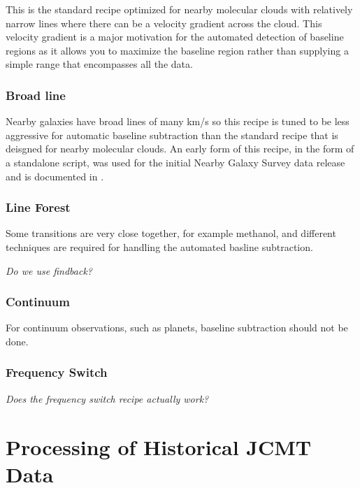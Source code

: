\documentclass[final,authoryear,5p,times,twocolumn]{elsarticle}
\begin{document}
This is the standard recipe optimized for nearby molecular clouds with
relatively narrow lines where there can be a velocity gradient across
the cloud. This velocity gradient is a major motivation for the
automated detection of baseline regions as it allows you to maximize
the baseline region rather than supplying a simple range that
encompasses all the data.

\subsubsection{Broad line}

Nearby galaxies have broad lines of many km/s so this recipe is tuned
to be less aggressive for automatic baseline subtraction than the
standard recipe that is deisgned for nearby molecular clouds. An early
form of this recipe, in the form of a standalone script, was used for
the initial Nearby Galaxy Survey data release and is documented in
\citet{2010ApJ...714..571W}.

\subsubsection{Line Forest}

Some transitions are very close together, for example methanol, and
different techniques are required for handling the automated basline
subtraction.

\textit{Do we use findback?}

\subsubsection{Continuum}

For continuum observations, such as planets, baseline subtraction
should not be done.

\subsubsection{Frequency Switch}

\textit{Does the frequency switch recipe actually work?}

\section{Processing of Historical JCMT Data}
\end{document}
